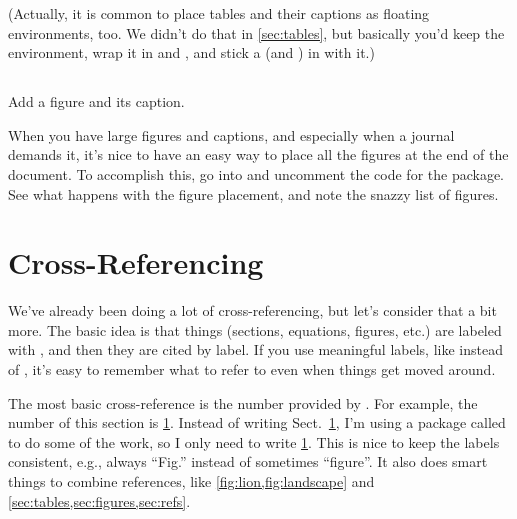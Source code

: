 \documentclass{article}
\begin{document}
(Actually, it is common to place tables and their captions as floating environments, too.
We didn't do that in \cref{sec:tables}, but basically you'd keep the  environment, wrap it in  and , and stick a \latexcode{\\caption} (and \latexcode{\\label}) in with it.)

\subsection*{\task}

Add a figure and its caption.

When you have large figures and captions, and especially when a journal demands it, it's nice to have an easy way to place all the figures at the end of the document.
To accomplish this, go into  and uncomment the code for the  package.
See what happens with the figure placement, and note the snazzy list of figures.

\section{Cross-Referencing}
\label{sec:refs}

We've already been doing a lot of cross-referencing, but let's consider that a bit more.
The basic idea is that things (sections, equations, figures, etc.) are labeled with \latexcode{\\label}, and then they are cited by label.
If you use meaningful labels, like  instead of , it's easy to remember what to refer to even when things get moved around.

The most basic cross-reference is the number provided by \latexcode{\\ref}.
For example, the number of this section is \ref{sec:refs}.
Instead of writing Sect.~\ref{sec:refs}, I'm using a package called  to do some of the work, so I only need to write \cref{sec:refs}.
This is nice to keep the labels consistent, e.g., always ``Fig.'' instead of sometimes ``figure''.
It also does smart things to combine references, like \cref{fig:lion,fig:landscape} and \cref{sec:tables,sec:figures,sec:refs}.
\end{document}
